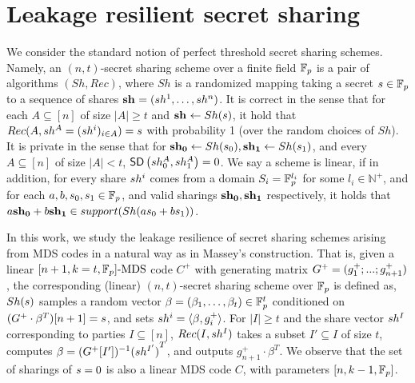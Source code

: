 \section{Leakage resilient secret sharing}
We consider the standard notion of perfect threshold secret sharing schemes. Namely, an $(n,t)$-secret sharing scheme over a finite field $\mathbb{F}_p$ is a pair of algorithms $(Sh,Rec)$, where $Sh$ is a randomized mapping taking a secret $s \in \mathbb{F}_p$ to a sequence of shares $\mathbf{sh_{}}=(sh_{}^{1},\ldots,sh_{}^{n})$. It is correct in the sense that for each $A\subseteq [n]$ of size $|A|\geq t$ and $\mathbf{sh_{}}\leftarrow Sh(s)$, it hold that $Rec(A,sh_{}^{A}=(sh_{}^{i})_{i\in A})=s$ with probability 1 (over the random choices of $Sh$). It is private in the sense that for $\mathbf{sh_{0}} \leftarrow Sh(s_0),\mathbf{sh_{1}}\leftarrow Sh(s_1)$, and every $A\subseteq [n]$ of size $|A|<t$, $\mathsf{SD} \left({sh_{0}^{A}},{sh_{1}^{A}} \right)=0$. We say a scheme is linear, if in addition, for every share $sh_{}^{i}$ comes from a domain $S_i=\mathbb{F}^{l_i}_p$ for some $l_i\in \mathbb{N}^+$, and for each $a,b,s_0,s_1\in \mathbb{F}_p$, and valid sharings
$\mathbf{sh_{0}},\mathbf{sh_{1}}$ respectively, it holds that $a\mathbf{sh_{0}}+b\mathbf{sh_{1}}\in support(Sh(a s_0+b s_1))$.


In this work, we study the leakage resilience of secret sharing schemes arising from MDS codes in a natural way as in Massey's construction. That is, given a linear $[n+1,k=t,\mathbb{F}_p]\text{-MDS}$ code $C^+$ with generating matrix $G^+ = (g^+_1;...;g^+_{n+1})$, the corresponding (linear) $(n,t)$-secret sharing scheme over $\mathbb{F}_p$ is defined as,
$Sh(s)$ samples a random vector $\beta=(\beta_1,\ldots,\beta_t)\in\mathbb{F}^t_p$ conditioned on $(G^+ \cdot \beta^T)[n+1]=s$, and sets $sh_{}^{i}=\langle\beta,g^+_i\rangle$. For $|I| \geq t$ and the share vector $sh_{}^{I}$ corresponding to parties $I\subseteq [n]$, $Rec(I,sh_{}^{I})$ takes a subset $I'\subseteq I$ of size $t$, computes $\beta = (G^+[I'])^{-1}{(sh_{}^{I'})}^T$, and outputs $g^+_{n+1}\cdot \beta^T$. We observe that the set of sharings of $s=0$ is also a linear MDS code $C$, with parameters $[n,k-1,\mathbb{F}_p]$.

